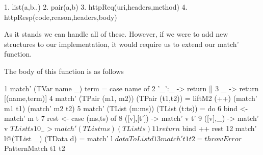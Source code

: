 \label{list:patterns}
\begin{code}
    1. list(a,b..)
    2. pair(a,b)
    3. httpReq(uri,headers,method)
    4. httpResp(code,reason,headers,body)
\end{code}

As it stands we can handle all of these. However, if we were to add new structures to our implementation, it would require us to extend our match' function. 

The body of this function is as follows
\begin{code}
1  match' (TVar name _) term = case name of                                                
2                                 '_':_ -> return []
3                                 _     -> return [(name,term)]
4  match' (TPair (m1, m2)) (TPair (t1,t2)) = 
                    liftM2 (++) (match' m1 t1)  (match' m2 t2)
5  match' (TList (m:ms)) (TList (t:ts)) = do
6                 bind <- match' m t
7                 rest <- case (ms,ts) of
8                    ([v],[t']) -> match' v t'
9                    ([v],_)    -> match' v $ TList ts
10                    _         -> match' (TList ms) (TList ts)
11                return $ bind ++ rest
12 match' l@(TList _) (TData d) = match' l $ dataToList d
13 match' t1 t2 = throwError $ PatternMatch t1 t2
\end{code}

